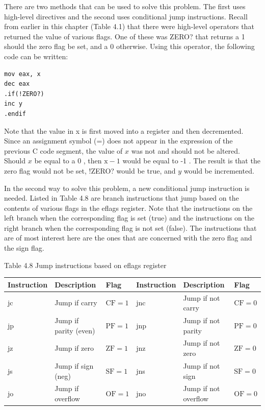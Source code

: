 \documentclass[10pt]{book}
\begin{document}
There are two methods that can be used to solve this problem. The first uses high-level directives and the second uses conditional jump instructions. Recall from earlier in this chapter (Table 4.1) that there were high-level operators that returned the value of various flags. One of these was ZERO? that returns a 1 should the zero flag be set, and a 0 otherwise. Using this operator, the following code can be written:

\begin{verbatim}
mov eax, x
dec eax
.if(!ZERO?)
inc y
.endif
\end{verbatim}

Note that the value in x is first moved into a register and then decremented. Since an assignment symbol (=) does not appear in the expression of the previous C code segment, the value of $x$ was not and should not be altered. Should $x$ be equal to a 0 , then $\mathrm{x}-1$ would be equal to -1 . The result is that the zero flag would not be set, !ZERO? would be true, and $y$ would be incremented.

In the second way to solve this problem, a new conditional jump instruction is needed. Listed in Table 4.8 are branch instructions that jump based on the contents of various flags in the eflags register. Note that the instructions on the left branch when the corresponding flag is set (true) and the instructions on the right branch when the corresponding flag is not set (false). The instructions that are of most interest here are the ones that are concerned with the zero flag and the sign flag.

Table 4.8 Jump instructions based on eflags register


\begin{center}
\begin{tabular}{|l|l|l|l|l|l|}
\hline
Instruction & Description & Flag & Instruction & Description & Flag \\
\hline
jc & Jump if carry & $\mathrm{CF}=1$ & jnc & Jump if not carry & $\mathrm{CF}=0$ \\
\hline
jp & Jump if parity (even) & $\mathrm{PF}=1$ & jnp & Jump if not parity & $\mathrm{PF}=0$ \\
\hline
jz & Jump if zero & $\mathrm{ZF}=1$ & jnz & Jump if not zero & $\mathrm{ZF}=0$ \\
\hline
js & Jump if sign (neg) & $\mathrm{SF}=1$ & jns & Jump if not sign & $\mathrm{SF}=0$ \\
\hline
jo & Jump if overflow & $\mathrm{OF}=1$ & jno & Jump if not overflow & $\mathrm{OF}=0$ \\
\hline
\end{tabular}
\end{center}
\end{document}
